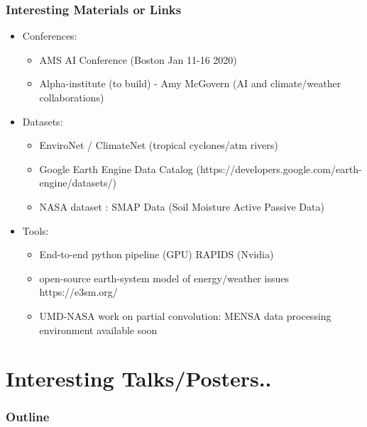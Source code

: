 \documentclass{beamer}
\begin{document}
\begin{frame}
\frametitle{Interesting Materials or Links}

\begin{itemize}
	\item Conferences: 
	\begin{itemize}
	\item AMS AI Conference (Boston Jan 11-16 2020)
	\item Alpha-institute (to build) - Amy McGovern (AI and climate/weather collaborations)
\end{itemize}		
	\item Datasets: 
	\begin{itemize}
	\item EnviroNet / ClimateNet (tropical cyclones/atm rivers)
	\item Google Earth Engine Data Catalog (https://developers.google.com/earth-engine/datasets/)
	\item NASA dataset : SMAP Data (Soil Moisture Active Passive Data)
	\end{itemize}		
	
	\item Tools: 
	\begin{itemize}
	\item End-to-end python pipeline (GPU) RAPIDS (Nvidia)
	\item open-source earth-system model of energy/weather issues https://e3sm.org/
	\item UMD-NASA work on partial convolution: MENSA data processing environment available soon
	\end{itemize}
	

\end{itemize}
\end{frame}

\section{Interesting Talks/Posters..}

\begin{frame}
\frametitle{Outline} %
\tableofcontents[currentsection] %
\end{frame}
%
\end{document}
